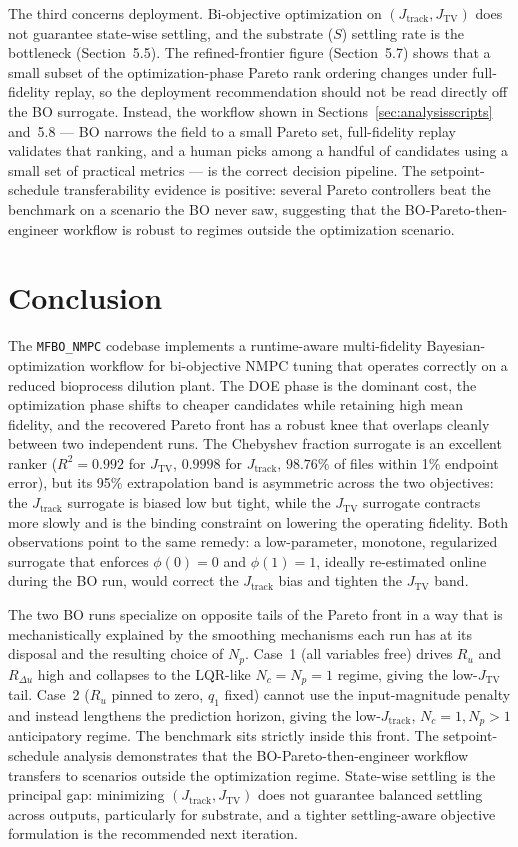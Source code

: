 \documentclass[11pt,a4paper]{article}
\newcommand{\jtrack}{J_{\mathrm{track}}}
\newcommand{\jtv}{J_{\mathrm{TV}}}
\newcommand{\Nc}{N_c}
\newcommand{\Np}{N_p}
\begin{document}
The third concerns deployment. Bi-objective optimization on $(\jtrack, \jtv)$ does not guarantee state-wise settling, and the substrate ($S$) settling rate is the bottleneck (Section~5.5). The refined-frontier figure (Section~5.7) shows that a small subset of the optimization-phase Pareto rank ordering changes under full-fidelity replay, so the deployment recommendation should not be read directly off the BO surrogate. Instead, the workflow shown in Sections~\ref{sec:analysisscripts} and~5.8 --- BO narrows the field to a small Pareto set, full-fidelity replay validates that ranking, and a human picks among a handful of candidates using a small set of practical metrics --- is the correct decision pipeline. The setpoint-schedule transferability evidence is positive: several Pareto controllers beat the benchmark on a scenario the BO never saw, suggesting that the BO-Pareto-then-engineer workflow is robust to regimes outside the optimization scenario.

\section{Conclusion}
\label{sec:conclusion}

The \texttt{MFBO\_NMPC} codebase implements a runtime-aware multi-fidelity Bayesian-optimization workflow for bi-objective NMPC tuning that operates correctly on a reduced bioprocess dilution plant. The DOE phase is the dominant cost, the optimization phase shifts to cheaper candidates while retaining high mean fidelity, and the recovered Pareto front has a robust knee that overlaps cleanly between two independent runs. The Chebyshev fraction surrogate is an excellent ranker ($R^2 = 0.992$ for $\jtv$, $0.9998$ for $\jtrack$, $98.76\%$ of files within 1\% endpoint error), but its 95\% extrapolation band is asymmetric across the two objectives: the $\jtrack$ surrogate is biased low but tight, while the $\jtv$ surrogate contracts more slowly and is the binding constraint on lowering the operating fidelity. Both observations point to the same remedy: a low-parameter, monotone, regularized surrogate that enforces $\phi(0) = 0$ and $\phi(1) = 1$, ideally re-estimated online during the BO run, would correct the $\jtrack$ bias and tighten the $\jtv$ band.

The two BO runs specialize on opposite tails of the Pareto front in a way that is mechanistically explained by the smoothing mechanisms each run has at its disposal and the resulting choice of $\Np$. Case~1 (all variables free) drives $R_u$ and $R_{\Delta u}$ high and collapses to the LQR-like $\Nc = \Np = 1$ regime, giving the low-$\jtv$ tail. Case~2 ($R_u$ pinned to zero, $q_1$ fixed) cannot use the input-magnitude penalty and instead lengthens the prediction horizon, giving the low-$\jtrack$, $\Nc = 1, \Np > 1$ anticipatory regime. The benchmark sits strictly inside this front. The setpoint-schedule analysis demonstrates that the BO-Pareto-then-engineer workflow transfers to scenarios outside the optimization regime. State-wise settling is the principal gap: minimizing $(\jtrack, \jtv)$ does not guarantee balanced settling across outputs, particularly for substrate, and a tighter settling-aware objective formulation is the recommended next iteration.
\end{document}
